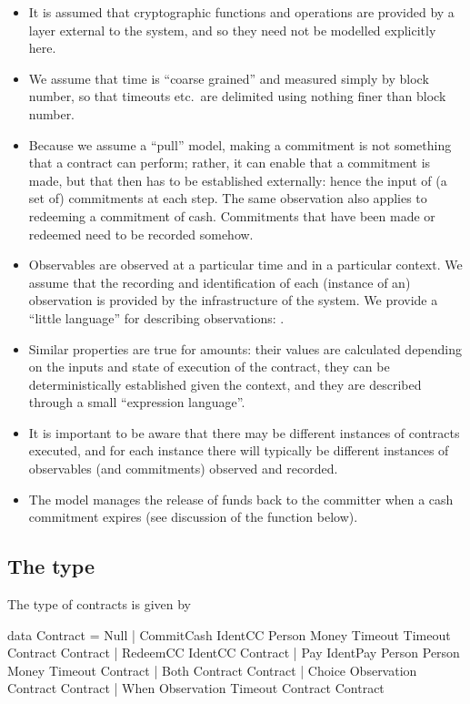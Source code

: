 \documentclass[
      acmsmall
    , screen
    , review=true
  ]{acmart}
\begin{document}
\begin{itemize}
\item It is assumed that cryptographic functions and operations are provided by a layer external to the system, and so they need not be modelled explicitly here.
\item We assume that time is ``coarse grained'' and measured simply by block number, so that timeouts etc.\ are delimited using nothing finer than block number. 
\item Because we assume a ``pull'' model, making a commitment is not something that a contract can perform; rather, it can enable that a commitment is made, but that then has to be established externally: hence the input of (a set of) commitments at each step. The same observation also applies to redeeming a commitment of cash. Commitments that have been made or redeemed need to be recorded somehow.

\item Observables are observed at a particular time and in a particular context. We assume that the recording and 
identification of each (instance of an) observation is provided by the infrastructure of the system. We provide a 
``little language'' for describing observations: . 
\item
Similar properties are true for
 amounts: their values are calculated depending on the inputs and state of execution of the 
contract, they can be deterministically established given the context, and they are described through a small 
``expression language''.
\item It is important to be aware that there may be different instances of contracts executed, and for each instance there will typically be different instances of observables (and commitments) observed and recorded.
\item The model manages the release of funds back to the committer when a cash commitment expires (see discussion of the  function below).
\end{itemize}

\subsection{The  type}

The type of contracts is given by

\begin{haskellcode}
data Contract =
   Null |
   CommitCash IdentCC Person Money Timeout Timeout Contract Contract |  
   RedeemCC IdentCC Contract |
   Pay IdentPay Person Person Money Timeout Contract |  
   Both Contract Contract |
   Choice Observation Contract Contract |
   When Observation Timeout Contract Contract   
   \end{haskellcode}
\end{document}
